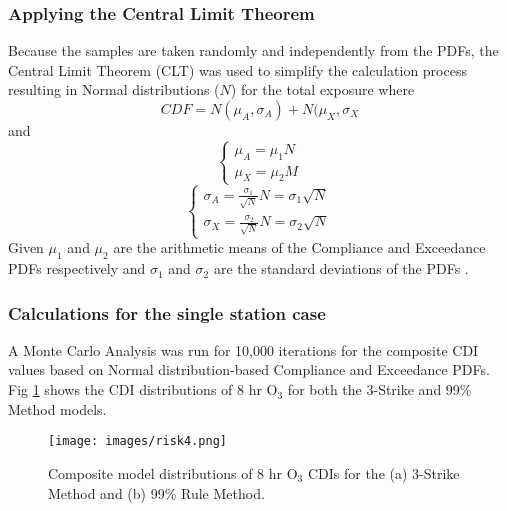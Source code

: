 \subsubsection{Applying the Central Limit Theorem}

Because the samples are taken randomly and independently from the PDFs, the Central Limit Theorem (CLT) was used to simplify the calculation process resulting in Normal distributions ($N$) for the total exposure where
%
\begin{equation}
\label{eq4:cdfN}
CDF=N(\mu_{A},\sigma_{A})+N(\mu_{X},\sigma_{X}
\end{equation}
%
\noindent
and
%
\begin{equation}
\label{eq5:cdfmu}
\left\{\begin{matrix}
\mu_{A} = \mu_{1}N
\\ 
\mu_{X} = \mu_{2}M
\end{matrix}\right.
\end{equation}
%
\begin{equation}
\label{eq6:cdfsigma}
\left\{\begin{matrix}
\sigma_{A} = \frac{\sigma_{1}}{\sqrt{N}}N = \sigma_{1}\sqrt{N}
\\ 
\sigma_{X} = \frac{\sigma_{2}}{\sqrt{N}}N = \sigma_{2}\sqrt{N}
\end{matrix}\right.
\end{equation}
%
Given $\mu_{1}$ and $\mu_{2}$ are the arithmetic means of the Compliance and Exceedance PDFs respectively and $\sigma_{1}$ and $\sigma_{2}$ are the standard deviations of the PDFs \citep{Ott1981}. 

\subsubsection{Calculations for the single station case}

A Monte Carlo Analysis was run for 10,000 iterations for the composite CDI values based on Normal distribution-based Compliance and Exceedance PDFs.  Fig \ref{fig4:composite} shows the CDI distributions of 8 hr O$_{3}$ for both the 3-Strike and 99\% Method models. 
%  
\begin{figure}
\texttt{[image: images/risk4.png]} 
\caption[Composite model distributions of 8 hr O$_{3}$ CDIs]{Composite model distributions of 8 hr O$_{3}$ CDIs for the (a) 3-Strike Method and (b) 99\% Rule Method.}
\label{fig4:composite}
\end{figure}
%

